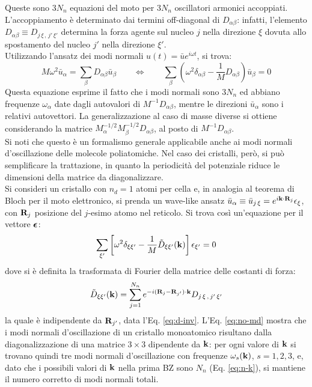 Queste sono $ 3N_n $ equazioni del moto per $ 3N_n $ oscillatori armonici accoppiati. L'accoppiamento è determinato dai termini off-diagonal di $ D_{\alpha \beta} $: infatti, l'elemento $ D_{\alpha \beta} \equiv D_{j\, \xi \,,\, j'\, \xi'} $ determina la forza agente sul nucleo $ j $ nella direzione $ \xi $ dovuta allo spostamento del nucleo $ j' $ nella direzione $ \xi' $. \\
Utilizzando l'ansatz dei modi normali $ u(t) = \bar{u} e^{i \omega t} $, si trova:
\begin{equation*}
	M \omega^2 \bar{u}_\alpha = \sum_\beta D_{\alpha \beta} \bar{u}_\beta
	\qquad \Leftrightarrow \qquad
	\sum_\beta \left( \omega^2 \delta_{\alpha \beta} - \frac{1}{M} D_{\alpha \beta} \right) \bar{u}_\beta = 0
\end{equation*}
Questa equazione esprime il fatto che i modi normali sono $ 3N_n $ ed abbiano frequenze $ \omega_\alpha $ date dagli autovalori di $ M^{-1} D_{\alpha \beta} $, mentre le direzioni $ \bar{u}_\alpha $ sono i relativi autovettori. La generalizzazione al caso di masse diverse si ottiene considerando la matrice $ M_\alpha^{-1/2} M_\beta^{-1/2} D_{\alpha \beta} $, al posto di $ M^{-1} D_{\alpha \beta} $. \\
Si noti che questo è un formalismo generale applicabile anche ai modi normali d'oscillazione delle molecole poliatomiche. Nel caso dei cristalli, però, si può semplificare la trattazione, in quanto la periodicità del potenziale riduce le dimensioni della matrice da diagonalizzare. \\
Si consideri un cristallo con $ n_d = 1 $ atomi per cella e, in analogia al teorema di Bloch per il moto elettronico, si prenda un wave-like ansatz $ \bar{u}_\alpha \equiv \bar{u}_{j\,\xi} = e^{i \mathbf{k} \cdot \mathbf{R}_j} \epsilon_\xi $, con $ \mathbf{R}_j $ posizione del $ j $-esimo atomo nel reticolo. Si trova così un'equazione per il vettore $ \boldsymbol{\epsilon} $:
\begin{equation}
	\sum_{\xi'} \left[ \omega^2 \delta_{\xi \xi'} - \frac{1}{M} \tilde{D}_{\xi \xi'}(\mathbf{k}) \right] \epsilon_{\xi'} = 0
	\label{eq:no-md}
\end{equation}
dove si è definita la trasformata di Fourier della matrice delle costanti di forza:
\begin{equation}
	\tilde{D}_{\xi \xi'}(\mathbf{k}) = \sum_{j = 1}^{N_n} e^{-i (\mathbf{R}_j - \mathbf{R}_{j'}) \cdot \mathbf{k}} D_{j\,\xi \,,\, j'\,\xi'}
\end{equation}
la quale è indipendente da $ \mathbf{R}_{j'} $, data l'Eq. \ref{eq:d-inv}. L'Eq. \ref{eq:no-md} mostra che i modi normali d'oscillazione di un cristallo monoatomico risultano dalla diagonalizzazione di una matrice $ 3 \times 3 $ dipendente da $ \mathbf{k} $: per ogni valore di $ \mathbf{k} $ si trovano quindi tre modi normali d'oscillazione con frequenze $ \omega_s(\mathbf{k}) $, $ s = 1,2,3 $, e, dato che i possibili valori di $ \mathbf{k} $ nella prima BZ sono $ N_n $ (Eq. \ref{eq:n-k}), si mantiene il numero corretto di modi normali totali. \\
